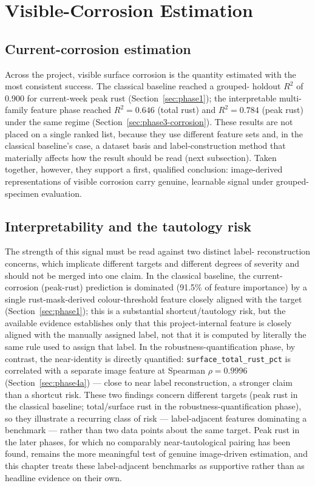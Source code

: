 \section{Visible-Corrosion Estimation}
\label{sec:results-visible}

\subsection{Current-corrosion estimation}

Across the project, visible surface corrosion is the quantity estimated
with the most consistent success. The classical baseline reached a grouped-
holdout $R^2$ of 0.900 for current-week peak rust
(Section~\ref{sec:phase1}); the interpretable multi-family feature phase
reached $R^2=0.646$ (total rust) and $R^2=0.784$ (peak rust) under the same
regime (Section~\ref{sec:phase3-corrosion}). These results are not placed
on a single ranked list, because they use different feature sets and, in
the classical baseline's case, a dataset basis and label-construction
method that materially affects how the result should be read (next
subsection). Taken together, however, they support a first, qualified
conclusion: image-derived representations of visible corrosion carry
genuine, learnable signal under grouped-specimen evaluation.

\subsection{Interpretability and the tautology risk}

The strength of this signal must be read against two distinct label-
reconstruction concerns, which implicate different targets and different
degrees of severity and should not be merged into one claim. In the
classical baseline, the current-corrosion (peak-rust) prediction is
dominated (91.5\% of feature importance) by a single rust-mask-derived
colour-threshold feature closely aligned with the target
(Section~\ref{sec:phase1}); this is a substantial shortcut/tautology risk,
but the available evidence establishes only that this project-internal
feature is closely aligned with the manually assigned label, not that it
is computed by literally the same rule used to assign that label. In the
robustness-quantification phase, by contrast, the near-identity is
directly quantified: \texttt{surface\_total\_rust\_pct} is correlated with
a separate image feature at Spearman $\rho=0.9996$
(Section~\ref{sec:phase4a}) — close to near label reconstruction, a
stronger claim than a shortcut risk. These two findings concern different
targets (peak rust in the classical baseline; total/surface rust in the
robustness-quantification phase), so they illustrate a recurring class of
risk — label-adjacent features dominating a benchmark — rather than two
data points about the same target. Peak rust in the later phases, for
which no comparably near-tautological pairing has been found, remains the
more meaningful test of genuine image-driven estimation, and this chapter
treats these label-adjacent benchmarks as supportive rather than as
headline evidence on their own.

